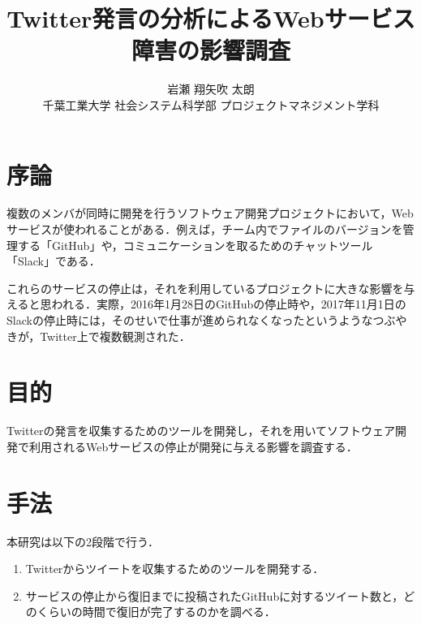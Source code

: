 \documentclass[uplatex,twocolumn]{jsarticle}
\title{\vspace{-10mm}Twitter発言の分析によるWebサービス障害の影響調査\footnotemark[0]}
\author{\large{岩瀬 翔\footnotemark[2]\qquad 矢吹 太朗}\\千葉工業大学 社会システム科学部 プロジェクトマネジメント学科\footnotemark[3]}
\date{}
\begin{document}
\twocolumn[\maketitle]

\begingroup
\def\thefootnote{\fnsymbol{footnote}}
\endgroup

\section{序論}
複数のメンバが同時に開発を行うソフトウェア開発プロジェクトにおいて，Webサービスが使われることがある．例えば，チーム内でファイルのバージョンを管理する「GitHub」や，コミュニケーションを取るためのチャットツール「Slack」である．

これらのサービスの停止は，それを利用しているプロジェクトに大きな影響を与えると思われる．実際，2016年1月28日のGitHubの停止時や，2017年11月1日のSlackの停止時には，そのせいで仕事が進められなくなったというようなつぶやきが，Twitter上で複数観測された\cite{01}．

\section{目的}

Twitterの発言を収集するためのツールを開発し，それを用いてソフトウェア開発で利用されるWebサービスの停止が開発に与える影響を調査する．

\section{手法}

本研究は以下の2段階で行う．
\begin{enumerate}
 \item Twitterからツイートを収集するためのツールを開発する．
 \item サービスの停止から復旧までに投稿されたGitHubに対するツイート数と，どのくらいの時間で復旧が完了するのかを調べる．
\end{enumerate}
\end{document}

